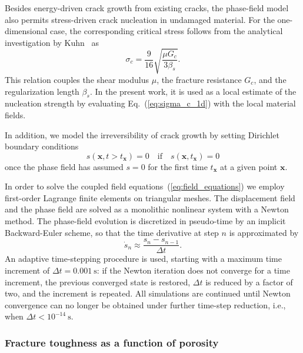 \documentclass[
	pdflatex,
	sn-mathphys-num
]{sn-jnl}
\theoremstyle{thmstyleone}%
\theoremstyle{thmstyletwo}%
\theoremstyle{thmstylethree}%
\begin{document}
Besides energy-driven crack growth from existing cracks, the
phase-field model also permits stress-driven crack nucleation in
undamaged material. For the one-dimensional case, the
corresponding critical stress follows from the analytical
investigation by Kuhn~\cite{kuhn_numerical_2013} as
\begin{equation}
	\sigma_c = \frac{9}{16}\sqrt{\frac{\mu G_c}{3\beta_s}}.
	\label{eq:sigma_c_1d}
\end{equation}
This relation couples the shear modulus $\mu$, the fracture
resistance $G_c$, and the regularization length $\beta_s$. In
the present work, it is used as a local estimate of
the nucleation strength by evaluating Eq.~(\ref{eq:sigma_c_1d})
with the local material fields.

In addition, we model the irreversibility of crack growth by
setting Dirichlet boundary conditions
\begin{equation}
	s\left(\boldsymbol{x},t>t_{\boldsymbol{x}}\right) =
	0\quad\text{if}\quad{s}
	\left(\boldsymbol{x},t_{\boldsymbol{x}}\right)=0
\end{equation}
once the phase field has assumed $s=0$ for the first time
$t_{\boldsymbol{x}}$ at a given point $\boldsymbol{x}$.

In order to solve the coupled field
equations~(\ref{eq:field_equations}) we employ first-order
Lagrange finite elements on triangular meshes. The displacement
field and the phase field are solved as a monolithic nonlinear
system with a Newton method. The phase-field evolution is
discretized in pseudo-time by an implicit Backward-Euler scheme,
so that the time derivative at step $n$ is approximated by
\begin{equation}
	\dot{s}_n \approx \frac{s_n-s_{n-1}}{\Delta t}.
\end{equation}
An adaptive time-stepping procedure is used, starting with a
maximum time increment of $\Delta t=0.001~\mathrm{s}$: if the
Newton iteration does not converge for a time increment, the
previous converged state is restored, $\Delta t$ is reduced by a
factor of two, and the increment is repeated. All simulations
are continued until Newton convergence can no longer be obtained
under further time-step reduction, i.e., when
$\Delta t<10^{-14}~\mathrm{s}$.

\subsubsection{Fracture toughness as a function of porosity}
\end{document}
